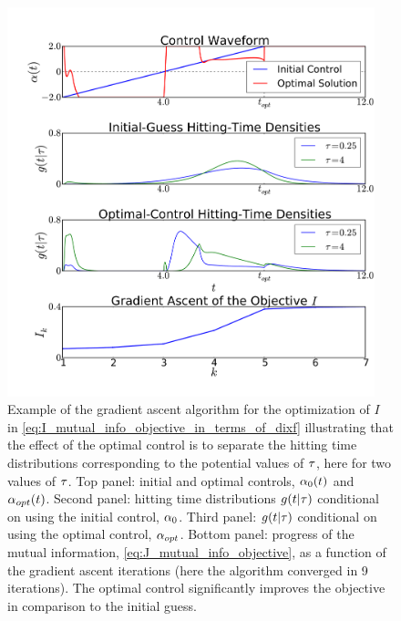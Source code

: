 \documentclass{article}
\begin{document}
\begin{figure}[htp] 
\begin{center}
\includegraphics[width=0.95\textwidth]{Figs/AdjointOptimizer/GradientAscent_Nt2.pdf}
\caption[Gradient Ascent for the Optimal Stimulation]{Example of the
    gradient ascent algorithm for the optimization of $I$ in
  \cref{eq:I_mutual_info_objective_in_terms_of_dixf} illustrating that the
  effect of the optimal control is to separate the
  hitting time distributions corresponding to the potential values of
  ${ \tau }$, here for two values of ${ \tau }$.
  Top
  panel: initial and optimal controls, ${\alpha}_{0}(t)$ and
  ${\alpha}_{opt}(t)$. Second panel: hitting time distributions $g(t|{ \tau })$ 
  conditional on 
  using the initial control, ${\alpha}_0$.
  Third panel: $g(t|{ \tau })$ conditional on using the
  optimal control, ${\alpha}_{opt}$.
 Bottom panel: progress of the mutual information,  
  \cref{eq:J_mutual_info_objective}, as a function of the gradient ascent
  iterations (here the algorithm converged in 9 iterations). The
  optimal control significantly improves the objective in comparison
  to the 
  initial guess.}
  \label{fig:example_gradient_ascent}   
\end{center}   
\end{figure}    
 
\
\end{document}
